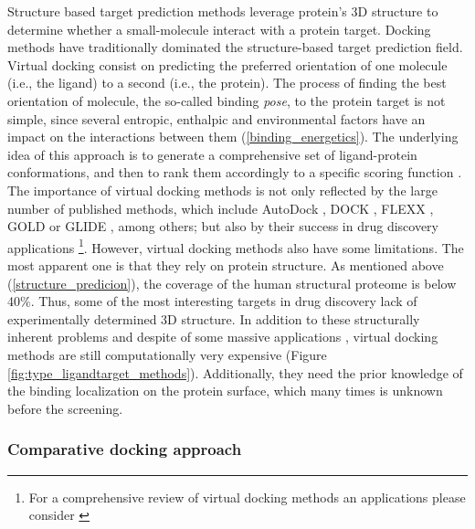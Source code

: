 \documentclass[11pt, b5paper,twoside]{tesi_upf}
\begin{document}
\par Structure based target prediction methods leverage protein's 3D structure to determine whether a small-molecule interact with a protein target. Docking methods have traditionally dominated the structure-based target prediction field. Virtual docking consist on predicting the preferred orientation of one molecule (i.e., the ligand) to a second (i.e., the protein). The process of finding the best orientation of molecule, the so-called binding \textit{pose}, to the protein target is not simple, since several entropic, enthalpic and environmental factors have an impact on the interactions between them (\cref{binding_energetics}). The underlying idea of this approach is to generate a comprehensive set of ligand-protein conformations, and then to rank them accordingly to a specific scoring function \cite{Alonso2006}. The importance of virtual docking methods is not only reflected by the large number of published methods, which include AutoDock \cite{Morris2009, Trott2010}, DOCK \cite{Ewing1997}, FLEXX \cite{Rarey1996}, GOLD \cite{Jones1997} or GLIDE \cite{Friesner2004}, among others; but also by their success in drug discovery applications \cite{Schames2004, Enyedy2001, Vangrevelinghe2003} \footnote{For a comprehensive review of virtual docking methods an applications please consider \cite{Kitchen2004}}. However, virtual docking methods also have some limitations. The most apparent one is that they rely on protein structure. As mentioned above (\cref{structure_predicion}), the coverage of the human structural proteome is below 40$\%$. Thus, some of the most interesting targets in drug discovery lack of experimentally determined 3D structure. In addition to these structurally inherent problems and despite of some massive applications \cite{Reardon2013}, virtual docking methods are still computationally very expensive (Figure \ref{fig:type_ligandtarget_methods}). Additionally, they need the prior knowledge of the binding localization on the protein surface, which many times is unknown before the screening. 

\subsubsection{Comparative docking approach}\label{comparative-docking}
\end{document}

